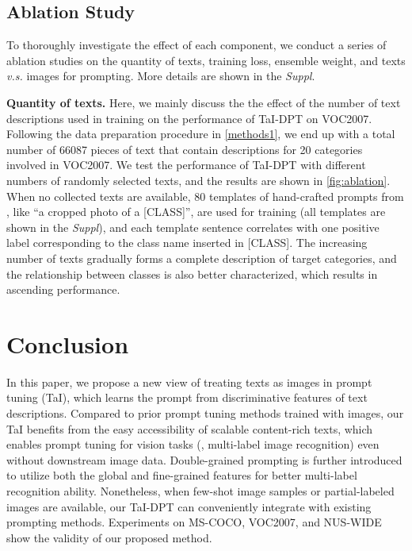 \documentclass[10pt,twocolumn,letterpaper]{article}
\begin{document}
\subsection{Ablation Study}
\label{e:ablation}
To thoroughly investigate the effect of each component, we conduct a series of ablation studies on the quantity of texts, training loss, ensemble weight, and texts \emph{v.s.} images for prompting. 
More details are shown in the \emph{Suppl}.


\noindent\textbf{Quantity of texts. } Here, we mainly discuss the the effect of the number of text descriptions used in training on the performance of TaI-DPT on VOC2007. Following the data preparation procedure in \cref{methods1}, we end up with a total number of 66087 pieces of text that contain descriptions for 20 categories involved in VOC2007.
We test the performance of TaI-DPT with different numbers of randomly selected texts, and the results are shown in \cref{fig:ablation}. 
When no collected texts are available, 80 templates of hand-crafted prompts from \cite{clip}, like ``a cropped photo of a [CLASS]'', are used for training (all templates are shown in the \emph{Suppl}), and each template sentence correlates with one positive label corresponding to the class name inserted in [CLASS]. The increasing number of texts gradually forms a complete description of target categories, and the relationship between classes is also better characterized, which results in ascending performance.










\section{Conclusion}
\label{sec:conclusion}
In this paper, we propose a new view of treating texts as images in prompt tuning (\ie TaI), which learns the prompt from discriminative features of text descriptions. Compared to prior prompt tuning methods trained with images, our TaI benefits from the easy accessibility of scalable content-rich texts, which enables prompt tuning for vision tasks (\eg, multi-label image recognition) even without downstream image data. 
Double-grained prompting is further introduced to utilize both the global and fine-grained features for better multi-label recognition ability.
Nonetheless, when few-shot image samples or partial-labeled images are available, our TaI-DPT can conveniently integrate with existing prompting methods.
Experiments on MS-COCO, VOC2007, and NUS-WIDE show the validity of our proposed method.
\end{document}

